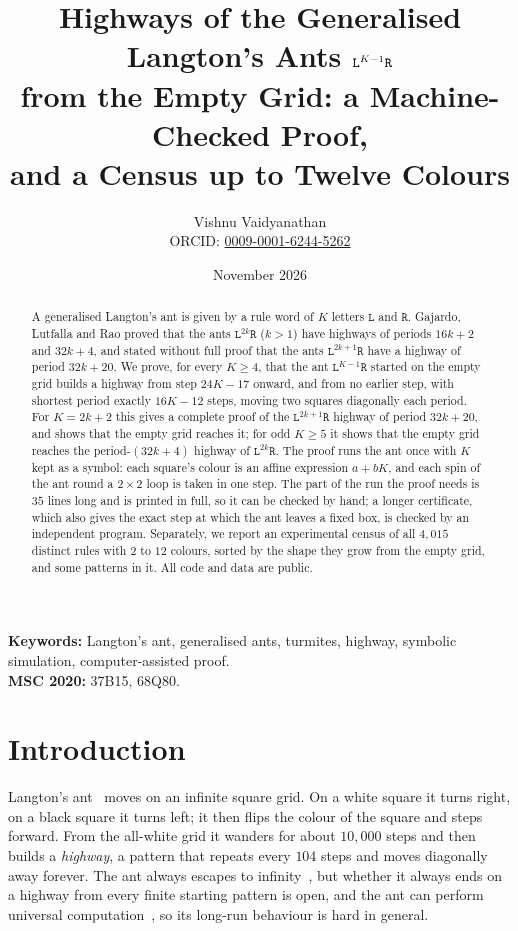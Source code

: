 \documentclass[11pt,a4paper]{article}
\title{Highways of the Generalised Langton's Ants $\Lw^{K-1}\Rw$\\ from the Empty Grid:
a Machine-Checked Proof,\\ and a Census up to Twelve Colours}
\author{Vishnu Vaidyanathan\\[2pt]
\small ORCID: \href{https://orcid.org/0009-0001-6244-5262}{0009-0001-6244-5262}}
\date{November 2026}
\theoremstyle{definition}
\theoremstyle{remark}
\newcommand{\Lw}{\mathtt{L}}
\newcommand{\Rw}{\mathtt{R}}
\begin{document}
\maketitle

\begin{abstract}
A generalised Langton's ant is given by a rule word of $K$ letters $\Lw$ and $\Rw$. Gajardo,
Lutfalla and Rao proved that the ants $\Lw^{2k}\Rw$ ($k > 1$) have highways of periods $16k+2$ and $32k+4$,
and stated without full proof that the ants $\Lw^{2k+1}\Rw$ have a highway of period $32k + 20$.
We prove, for every $K \ge 4$, that the ant $\Lw^{K-1}\Rw$ started on the empty grid builds a highway from
step $24K - 17$ onward, and from no earlier step, with shortest period exactly $16K - 12$ steps, moving
two squares diagonally each period. For $K = 2k + 2$ this gives a complete proof of the
$\Lw^{2k+1}\Rw$ highway of period $32k + 20$, and shows that the empty grid reaches it; for odd $K \ge 5$
it shows that the empty grid reaches the period-$(32k+4)$ highway of $\Lw^{2k}\Rw$.
The proof runs the ant once with $K$ kept as a symbol: each square's colour is an affine expression
$a + bK$, and each spin of the ant round a $2 \times 2$ loop is taken in one step. The part of the run
the proof needs is $35$ lines long and is printed in full, so it can be checked by hand; a longer
certificate, which also gives the exact step at which the ant leaves a fixed box, is checked by an
independent program. Separately, we report an experimental census of all $4{,}015$ distinct rules with
$2$ to $12$ colours, sorted by the shape they grow from the empty grid, and some patterns in it.
All code and data are public.
\end{abstract}

\noindent\textbf{Keywords:} Langton's ant, generalised ants, turmites, highway, symbolic simulation,
computer-assisted proof.\\
\textbf{MSC 2020:} 37B15, 68Q80.

\section{Introduction}

Langton's ant~\cite{langton} moves on an infinite square grid. On a white square it turns right, on a black
square it turns left; it then flips the colour of the square and steps forward. From the all-white grid it
wanders for about $10{,}000$ steps and then builds a \emph{highway}, a pattern that repeats every $104$ steps
and moves diagonally away forever. The ant always escapes to infinity~\cite{bunimovich}, but whether it
always ends on a highway from every finite starting pattern is open, and the ant can perform universal
computation~\cite{gajardo2002}, so its long-run behaviour is hard in general.
\end{document}
